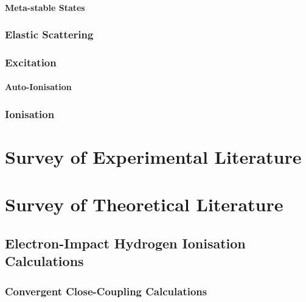 \documentclass[draft]{article}
\begin{document}
\paragraph{Meta-stable States}
\label{sec:he-meta-stable}


\subsubsection{Elastic Scattering}
\label{sec:e-he-elastic-scattering}

\subsubsection{Excitation}
\label{sec:e-he-excitation}

\paragraph{Auto-Ionisation}
\label{sec:e-he-auto-ionisation}

\subsubsection{Ionisation}
\label{sec:e-he-ionisation}

\section{Survey of Experimental Literature}
\label{sec:survey-experimental}

\section{Survey of Theoretical Literature}
\label{sec:survey-theoretical}

\subsection{Electron-Impact Hydrogen Ionisation Calculations}
\label{sec:e-h-ionisation-calculations}

\subsubsection{Convergent Close-Coupling Calculations}
\label{sec:e-h-ccc-calculations}
\end{document}
